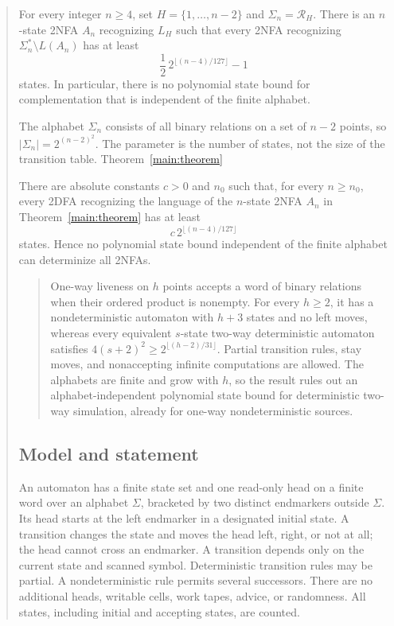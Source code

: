 \begin{abstract}
\begin{theorem}\label{main:theorem}
For every integer $n\ge4$, set $H=\{1,\ldots,n-2\}$ and
$\Sigma_n=\mathcal R_H$. There is an $n$-state 2NFA $A_n$ recognizing
$L_H$ such that every 2NFA recognizing
$\Sigma_n^*\setminus L(A_n)$ has at least
\[
 \frac12\,2^{\lfloor(n-4)/127\rfloor}-1
\]
states. In particular, there is no polynomial state bound for
complementation that is independent of the finite alphabet.
\end{theorem}

The alphabet $\Sigma_n$ consists of all binary relations on a set of
$n-2$ points, so $|\Sigma_n|=2^{(n-2)^2}$. The parameter is the
number of states, not the size of the transition table. Theorem~\ref{main:theorem}
\begin{corollary}\label{auto:determinization}
There are absolute constants $c>0$ and $n_0$ such that, for every
$n\ge n_0$, every 2DFA recognizing the language of the $n$-state 2NFA
$A_n$ in Theorem~\ref{main:theorem} has at least
\[
 c\,2^{\lfloor(n-4)/127\rfloor}
\]
states. Hence no polynomial state bound independent of the finite
alphabet can determinize all 2NFAs.
\end{corollary}

\begin{abstract}
One-way liveness on $h$ points accepts a word of binary relations when
their ordered product is nonempty. For every $h\ge2$, it has a
nondeterministic automaton with $h+3$ states and no left moves, whereas
every equivalent $s$-state two-way deterministic automaton satisfies
$4(s+2)^2\ge2^{\lfloor(h-2)/31\rfloor}$. Partial transition rules, stay
moves, and nonaccepting infinite computations are allowed. The alphabets are
finite and grow with $h$, so the result rules out an alphabet-independent
polynomial state bound for deterministic two-way simulation, already for
one-way nondeterministic sources.
\end{abstract}
\subsection{Model and statement}

An automaton has a finite state set and one read-only head on a finite word
over an alphabet $\Sigma$, bracketed by two distinct endmarkers outside
$\Sigma$. Its head starts at the left endmarker in a designated initial
state. A transition changes the state and moves the head left, right, or
not at all; the head cannot cross an endmarker. A transition depends only
on the current state and scanned symbol. Deterministic transition rules
may be partial. A nondeterministic rule permits several successors.
There are no additional heads, writable cells, work tapes, advice, or
randomness. All states, including initial and accepting states, are counted.


\end{abstract}

